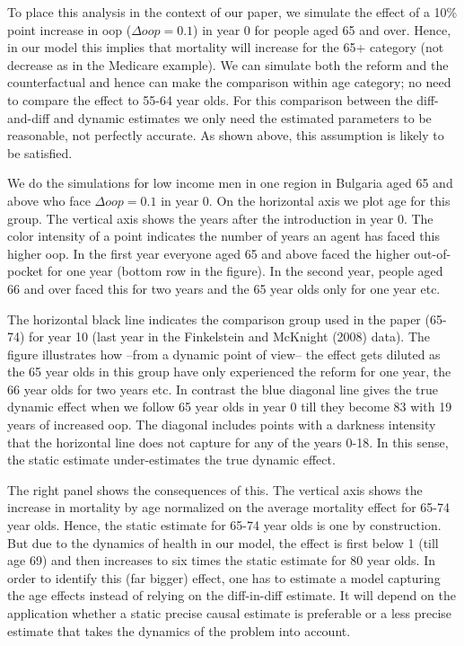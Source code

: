 \documentclass[a4paper,12pt]{article}
\makeatletter
\newcommand{\cslcitation}[2]
 {\protect\hyper@linkstart{cite}{citeproc_bib_item_#1}#2\hyper@linkend}
\makeatother
\begin{document}
To place this analysis in the context of our paper, we simulate the effect of a 10\% point increase in oop (\(\Delta oop = 0.1\)) in year 0 for people aged 65 and over. Hence, in our model this implies that mortality will increase for the 65+ category (not decrease as in the Medicare example). We can simulate both the reform and the counterfactual and hence can make the comparison within age category; no need to compare the effect to 55-64 year olds. For this comparison between the diff-and-diff and dynamic estimates we only need the estimated parameters to be reasonable, not perfectly accurate. As shown above, this assumption is likely to be satisfied.

We do the simulations for low income men in one region in Bulgaria aged 65 and above who face \(\Delta oop = 0.1\) in year 0. On the horizontal axis we plot age for this group. The vertical axis shows the years after the introduction in year 0. The color intensity of a point indicates the number of years an agent has faced this higher oop. In the first year everyone aged 65 and above faced the higher out-of-pocket for one year (bottom row in the figure). In the second year, people aged 66 and over faced this for two years and the 65 year olds only for one year etc.

The horizontal black line indicates the comparison group used in the paper (65-74) for year 10 (last year in the Finkelstein and McKnight (\cslcitation{4}{2008}) data). The figure illustrates how --from a dynamic point of view-- the effect gets diluted as the 65 year olds in this group have only experienced the reform for one year, the 66 year olds for two years etc. In contrast the blue diagonal line gives the true dynamic effect when we follow 65 year olds in year 0 till they become 83 with 19 years of increased oop. The diagonal includes points with a darkness intensity that the horizontal line does not capture for any of the years 0-18. In this sense, the static estimate under-estimates the true dynamic effect.

The right panel shows the consequences of this. The vertical axis shows the increase in mortality by age normalized on the average mortality effect for 65-74 year olds. Hence, the static estimate for 65-74 year olds is one by construction. But due to the dynamics of health in our model, the effect is first below 1 (till age 69) and then increases to six times the static estimate for 80 year olds. In order to identify this (far bigger) effect, one has to estimate a model capturing the age effects instead of relying on the diff-in-diff estimate. It will depend on the application whether a static precise causal estimate is preferable or a less precise estimate that takes the dynamics of the problem into account.
\end{document}
